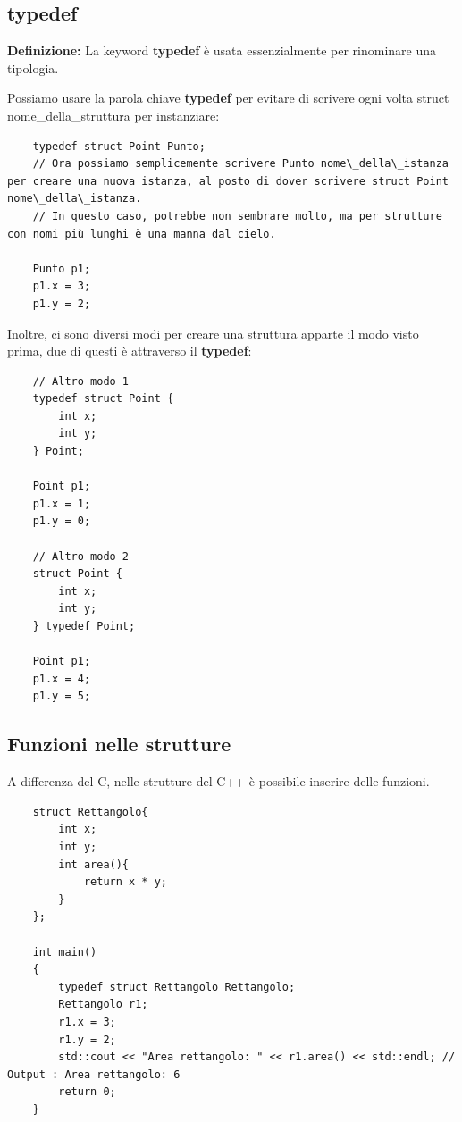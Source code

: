 \subsection{typedef}

\textsf{\small \textbf{Definizione: } La keyword \textbf{typedef} è usata essenzialmente per rinominare una tipologia.}

\textsf{\small Possiamo usare la parola chiave \textbf{typedef} per evitare di scrivere ogni volta struct nome\_della\_struttura per instanziare:} \\

\begin{lstlisting}
	typedef struct Point Punto;
	// Ora possiamo semplicemente scrivere Punto nome\_della\_istanza per creare una nuova istanza, al posto di dover scrivere struct Point nome\_della\_istanza.
	// In questo caso, potrebbe non sembrare molto, ma per strutture con nomi più lunghi è una manna dal cielo.
	
	Punto p1;
	p1.x = 3;
	p1.y = 2;
\end{lstlisting}

\textsf{\small Inoltre, ci sono diversi modi per creare una struttura apparte il modo visto prima, due di questi è attraverso il \textbf{typedef}: } \\

\begin{lstlisting}
	// Altro modo 1
	typedef struct Point {
		int x;
		int y;
	} Point;

	Point p1;
	p1.x = 1;
	p1.y = 0;
	
	// Altro modo 2
	struct Point {
		int x;
		int y;
	} typedef Point;

	Point p1;
	p1.x = 4;
	p1.y = 5;
\end{lstlisting}

\subsection{Funzioni nelle strutture} %

\textsf{\small A differenza del C, nelle strutture del C++ è possibile inserire delle funzioni.} \\

\begin{lstlisting}
	struct Rettangolo{
		int x;
		int y;
		int area(){
			return x * y;
		}
	};

	int main()
	{
		typedef struct Rettangolo Rettangolo;
		Rettangolo r1;
		r1.x = 3;
		r1.y = 2;
		std::cout << "Area rettangolo: " << r1.area() << std::endl; // Output : Area rettangolo: 6
		return 0;
	}
\end{lstlisting}

